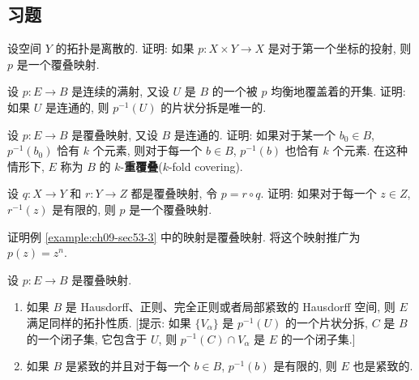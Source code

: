 \subsection*{习题}

\begin{exercise}
设空间 $Y$ 的拓扑是离散的. 证明: 如果 $p\colon X\times Y\to X$ 是对于第一个坐标的投射, 则 $p$ 是一个覆叠映射.
\end{exercise}

\begin{exercise}
设 $p\colon E\to B$ 是连续的满射, 又设 $U$ 是 $B$ 的一个被 $p$ 均衡地覆盖着的开集. 证明: 如果 $U$ 是连通的, 则 $p^{-1}(U)$ 的片状分拆是唯一的.
\end{exercise}

\begin{exercise}
设 $p\colon E\to B$ 是覆叠映射, 又设 $B$ 是连通的. 证明: 如果对于某一个 $b_0\in B$, $p^{-1}(b_0)$ 恰有 $k$ 个元素, 则对于每一个 $b\in B$, $p^{-1}(b)$ 也恰有 $k$ 个元素. 在这种情形下, $E$ 称为 $B$ 的 $k$-\textbf{重覆叠}($k$-fold covering).
\end{exercise}

\begin{exercise}
设 $q\colon X\to Y$ 和 $r\colon Y\to Z$ 都是覆叠映射, 令 $p=r\circ q$. 证明: 如果对于每一个 $z\in Z$, $r^{-1}(z)$ 是有限的, 则 $p$ 是一个覆叠映射.
\end{exercise}

\begin{exercise}
证明例 \cref{example:ch09-sec53-3} 中的映射是覆叠映射. 将这个映射推广为 $p(z)=z^n$.
\end{exercise}

\begin{exercise}
设 $p\colon E\to B$ 是覆叠映射.
\begin{enumerate}
\item 如果 $B$ 是 Hausdorff、正则、完全正则或者局部紧致的 Hausdorff 空间, 则 $E$ 满足同样的拓扑性质. [提示: 如果 $\{V_\alpha\}$ 是 $p^{-1}(U)$ 的一个片状分拆, $C$ 是 $B$ 的一个闭子集, 它包含于 $U$, 则 $p^{-1}(C)\cap V_\alpha$ 是 $E$ 的一个闭子集.]
\item 如果 $B$ 是紧致的并且对于每一个 $b\in B$, $p^{-1}(b)$ 是有限的, 则 $E$ 也是紧致的.
\end{enumerate}
\end{exercise}
